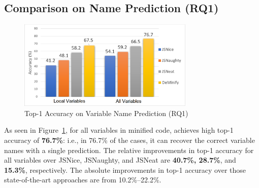 \subsection{{\bf Comparison on Name Prediction (RQ1)}}
\label{empirical-rq1}


\begin{figure}[t] %
\begin{center}
\includegraphics[width=3.3in]{figures/name-prediction-result-3} %
\vspace{-8pt}
\caption{Top-1 Accuracy on Variable Name Prediction (RQ1)}
\label{name-prediction-result}
\end{center}
\end{figure}





As seen in Figure~\ref{name-prediction-result}, for all variables in
minified code, {\tool} achieves high top-1 accuracy of {\bf 76.7\%}:
i.e., in 76.7\% of the cases, it can recover the correct variable names
with a single prediction. The relative improvements in top-1 accuracy
for all variables over JSNice, JSNaughty, and JSNeat are {\bf 40.7\%,
  28.7\%}, and {\bf 15.3\%}, respectively. The absolute improvements
in top-1 accuracy over those state-of-the-art approaches are from
10.2\%--22.2\%.

